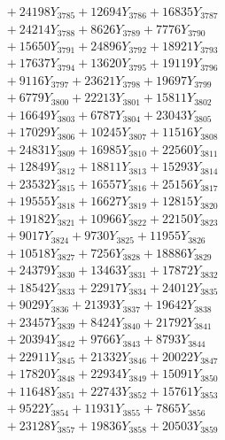 \documentclass[a4paper,10pt]{article}
\begin{document}
{\begin{align}
&\;  + 24198 Y_{3785} + 12694 Y_{3786} + 16835 Y_{3787} \\[0.3ex]
&\;  + 24214 Y_{3788} + 8626 Y_{3789} + 7776 Y_{3790} \\[0.3ex]
&\;  + 15650 Y_{3791} + 24896 Y_{3792} + 18921 Y_{3793} \\[0.3ex]
&\;  + 17637 Y_{3794} + 13620 Y_{3795} + 19119 Y_{3796} \\[0.3ex]
&\;  + 9116 Y_{3797} + 23621 Y_{3798} + 19697 Y_{3799} \\[0.3ex]
&\;  + 6779 Y_{3800} + 22213 Y_{3801} + 15811 Y_{3802} \\[0.3ex]
&\;  + 16649 Y_{3803} + 6787 Y_{3804} + 23043 Y_{3805} \\[0.3ex]
&\;  + 17029 Y_{3806} + 10245 Y_{3807} + 11516 Y_{3808} \\[0.5ex]\allowbreak
&\;  + 24831 Y_{3809} + 16985 Y_{3810} + 22560 Y_{3811} \\[0.3ex]
&\;  + 12849 Y_{3812} + 18811 Y_{3813} + 15293 Y_{3814} \\[0.3ex]
&\;  + 23532 Y_{3815} + 16557 Y_{3816} + 25156 Y_{3817} \\[0.3ex]
&\;  + 19555 Y_{3818} + 16627 Y_{3819} + 12815 Y_{3820} \\[0.3ex]
&\;  + 19182 Y_{3821} + 10966 Y_{3822} + 22150 Y_{3823} \\[0.3ex]
&\;  + 9017 Y_{3824} + 9730 Y_{3825} + 11955 Y_{3826} \\[0.3ex]
&\;  + 10518 Y_{3827} + 7256 Y_{3828} + 18886 Y_{3829} \\[0.3ex]
&\;  + 24379 Y_{3830} + 13463 Y_{3831} + 17872 Y_{3832} \\[0.3ex]
&\;  + 18542 Y_{3833} + 22917 Y_{3834} + 24012 Y_{3835} \\[0.3ex]
&\;  + 9029 Y_{3836} + 21393 Y_{3837} + 19642 Y_{3838} \\[0.5ex]\allowbreak
&\;  + 23457 Y_{3839} + 8424 Y_{3840} + 21792 Y_{3841} \\[0.3ex]
&\;  + 20394 Y_{3842} + 9766 Y_{3843} + 8793 Y_{3844} \\[0.3ex]
&\;  + 22911 Y_{3845} + 21332 Y_{3846} + 20022 Y_{3847} \\[0.3ex]
&\;  + 17820 Y_{3848} + 22934 Y_{3849} + 15091 Y_{3850} \\[0.3ex]
&\;  + 11648 Y_{3851} + 22743 Y_{3852} + 15761 Y_{3853} \\[0.3ex]
&\;  + 9522 Y_{3854} + 11931 Y_{3855} + 7865 Y_{3856} \\[0.3ex]
&\;  + 23128 Y_{3857} + 19836 Y_{3858} + 20503 Y_{3859} \\[0.3ex]

\end{align}}
\end{document}

